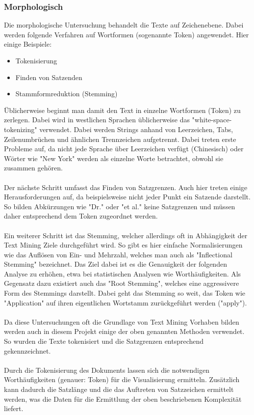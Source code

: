 \subsubsection{Morphologisch}
Die morphologische Untersuchung behandelt die Texte auf Zeichenebene. Dabei werden folgende Verfahren auf Wortformen (sogenannte Token) angewendet. Hier einige Beispiele:\\

\begin{itemize}
\item Tokenisierung
\item Finden von Satzenden
\item Stammformreduktion (Stemming)
\end{itemize}
Üblicherweise beginnt man damit den Text in einzelne Wortformen (Token) zu zerlegen. Dabei wird in westlichen Sprachen üblicherweise das "white-space-tokenizing" verwendet. Dabei werden Strings anhand von Leerzeichen, Tabs, Zeilenumbrüchen und ähnlichen Trennzeichen aufgetrennt. Dabei treten erste Probleme auf, da nicht jede Sprache über Leerzeichen verfügt (Chinesisch) oder Wörter wie "New York" werden als einzelne Worte betrachtet, obwohl sie zusammen gehören.\\
\\
Der nächste Schritt umfasst das Finden von Satzgrenzen. Auch hier treten einige Herausforderungen auf, da beispielsweise nicht jeder Punkt ein Satzende darstellt. So bilden Abkürzungen wie "Dr." oder "et al." keine Satzgrenzen und müssen daher entsprechend dem Token zugeordnet werden.\\
\\
Ein weiterer Schritt ist das Stemming, welcher allerdings oft in Abhängigkeit der Text Mining Ziele durchgeführt wird. So gibt es hier einfache Normalisierungen wie das Auflösen von Ein- und Mehrzahl, welches man auch als "Inflectional Stemming" bezeichnet. Das Ziel dabei ist es die Genauigkeit der folgenden Analyse zu erhöhen, etwa bei statistischen Analysen wie Worthäufigkeiten. Als Gegensatz dazu existiert auch das "Root Stemming", welches eine aggressivere Form des Stemmings darstellt. Dabei geht das Stemming so weit, das Token wie "Application" auf ihren eigentlichen Wortstamm zurückgeführt werden ("apply").\\
\\
Da diese Untersuchungen oft die Grundlage von Text Mining Vorhaben bilden werden auch in diesem Projekt einige der oben genannten Methoden verwendet. So wurden die Texte tokenisiert und die Satzgrenzen entsprechend gekennzeichnet. \\
\\
Durch die Tokenisierung des Dokuments lassen sich die notwendigen Worthäufigkeiten (genauer: Token)  für die Visualisierung ermitteln. Zusätzlich kann dadurch die Satzlänge und die das Auftreten von Satzzeichen ermittelt werden, was die Daten für die Ermittlung der oben beschriebenen Komplexität liefert.

